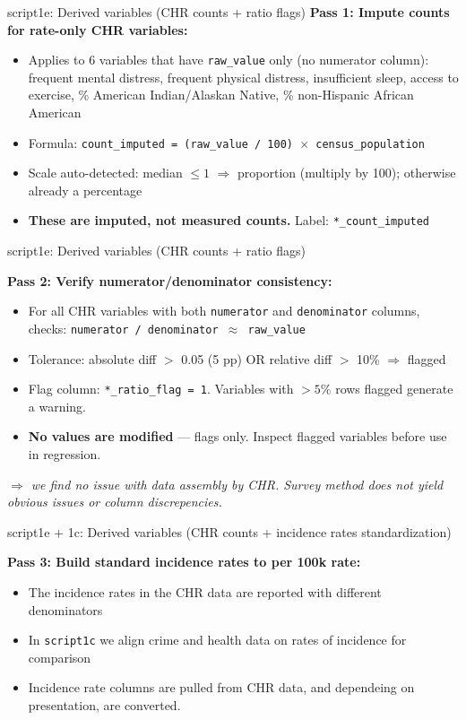 \documentclass[aspectratio=169]{beamer}
\begin{document}
\begin{frame}{script1e: Derived variables (CHR counts + ratio flags)}
\vspace{0.5em}
\textbf{Pass 1: Impute counts for rate-only CHR variables:}
\begin{itemize}\small
    \item Applies to 6 variables that have \texttt{raw\_value} only (no numerator column): frequent mental distress, frequent physical distress, insufficient sleep, access to exercise, \% American Indian/Alaskan Native, \% non-Hispanic African American
    \item Formula: \texttt{count\_imputed = (raw\_value / 100) $\times$ census\_population}
    \item Scale auto-detected: median $\leq 1$ $\Rightarrow$ proportion (multiply by 100); otherwise already a percentage
    \item \textbf{These are imputed, not measured counts.} Label: \texttt{*\_count\_imputed}
\end{itemize}

\end{frame}


\begin{frame}{script1e: Derived variables (CHR counts + ratio flags)}

\textbf{Pass 2: Verify numerator/denominator consistency:}
\begin{itemize}\small
    \item For all CHR variables with both \texttt{numerator} and \texttt{denominator} columns, checks: \texttt{numerator / denominator $\approx$ raw\_value}
    \item Tolerance: absolute diff $>$ 0.05 (5 pp) OR relative diff $>$ 10\% $\Rightarrow$ flagged
    \item Flag column: \texttt{*\_ratio\_flag = 1}. Variables with $>5\%$ rows flagged generate a warning.
    \item \textbf{No values are modified} — flags only. Inspect flagged variables before use in regression.
\end{itemize}
\textit{$\Rightarrow$ we find no issue with data assembly by CHR. Survey method does not yield obvious issues or column discrepencies.}
\end{frame}

\begin{frame}{script1e + 1c: Derived variables (CHR counts + incidence rates standardization)}


\textbf{Pass 3: Build standard incidence rates to per 100k rate:}
\begin{itemize}\small
    \item  The incidence rates in the CHR data are reported with different denominators
    \item In \texttt{script1c} we align crime and health data on rates of incidence for comparison
    \item Incidence rate columns are pulled from CHR data, and dependeing on presentation, are converted. \hyperlink{incidence-rate-calc}{}
    \end{itemize}
\end{frame}
\end{document}
